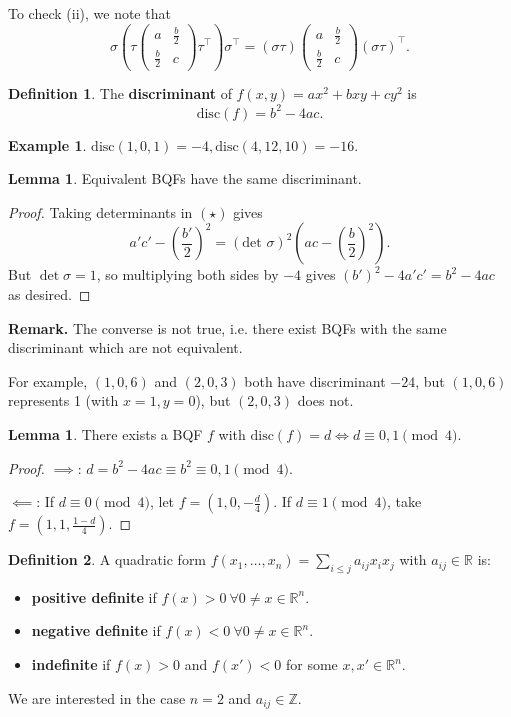 \documentclass{article}
\theoremstyle{definition}
\newtheorem{lemma}[theorem]{Lemma}
\newtheorem{example}{Example}[section]
\newtheorem{defn}{Definition}[section]
\begin{document}
To check (ii), we note that \[
\sigma\left(\tau \begin{pmatrix} a & \frac{b}{2} \\ \frac{b}{2} & c \end{pmatrix} \tau^\top\right)\sigma^\top = (\sigma \tau)\begin{pmatrix} a & \frac{b}{2} \\ \frac{b}{2} & c \end{pmatrix} (\sigma \tau)^\top.
\]
\begin{defn}
    The \textbf{discriminant} of $f(x,y) = ax^2+bxy+cy^2$ is $$\text{disc}(f) = b^2-4ac.$$
\end{defn}
\begin{example}
    $\text{disc}(1,0,1) = -4, \text{disc}(4,12,10) = -16$.
\end{example}
\begin{lemma}
    Equivalent BQFs have the same discriminant.
\end{lemma}
\begin{proof}
    Taking determinants in $(\star)$ gives
    \[
        a'c' - \left(\frac{b'}{2}\right)^2 = \left(\text{det }\sigma\right)^2\left(ac - \left(\frac{b}{2}\right)^2\right).
    \]
    But $\det \sigma = 1$, so multiplying both sides by $-4$ gives $(b')^2-4a'c' = b^2-4ac$ as desired.
\end{proof}
\textbf{Remark.} The converse is not true, i.e. there exist BQFs with the same discriminant which are not equivalent.

For example, $(1,0,6)$ and $(2,0,3)$ both have discriminant $-24$, but $(1,0,6)$ represents 1 (with $x=1,y=0$), but $(2,0,3)$ does not.
\begin{lemma}
    There exists a BQF $f$ with $\text{disc}(f)=d \iff d \equiv 0,1 \pmod{4}$. 
\end{lemma}
\begin{proof}
    $\implies$: $d = b^2-4ac \equiv b^2 \equiv 0,1 \pmod{4}$.

    $\impliedby$: If $d \equiv 0 \pmod{4}$, let $f = (1,0,-\frac{d}{4})$. If $d \equiv 1 \pmod{4}$, take $f = (1,1,\frac{1-d}{4})$.
\end{proof}


\begin{defn}
    A quadratic form $f(x_1,\ldots,x_n)=\sum_{i\le j}^{} a_{ij}x_ix_j$ with $a_{ij} \in \mathbb{R}$ is:
    \begin{itemize}
        \item \textbf{positive definite} if $f(x)>0 ~\forall 0 \neq x \in \mathbb{R}^n$.
        \item \textbf{negative definite} if $f(x)<0 ~\forall 0 \neq x \in \mathbb{R}^n$.
        \item \textbf{indefinite} if $f(x)>0$ and $f(x')<0$ for some $x,x' \in \mathbb{R}^n$. 
    \end{itemize}
\end{defn}
We are interested in the case $n=2$ and $a_{ij} \in \mathbb{Z}$.
\end{document}
